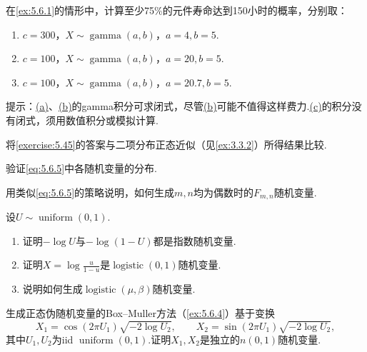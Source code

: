 \begin{exercise}\label{exercise:5.45}
在\autoref{ex:5.6.1}的情形中，计算至少75\%的元件寿命达到150小时的概率，分别取：
\begin{enumerate}[label=(\alph*)]\item{}\label{itm:exercise:5.45:a} $c=300$，$X\sim\operatorname{gamma}(a,b)$，$a=4,b=5$.\item{}\label{itm:exercise:5.45:b} $c=100$，$X\sim\operatorname{gamma}(a,b)$，$a=20,b=5$.\item{}\label{itm:exercise:5.45:c} $c=100$，$X\sim\operatorname{gamma}(a,b)$，$a=20.7,b=5$.\end{enumerate}
提示：\hyperref[itm:exercise:5.45:a]{(a)}、\hyperref[itm:exercise:5.45:b]{(b)}的gamma积分可求闭式，尽管\hyperref[itm:exercise:5.45:b]{(b)}可能不值得这样费力.\hyperref[itm:exercise:5.45:c]{(c)}的积分没有闭式，须用数值积分或模拟计算.
\end{exercise}
\begin{exercise}\label{exercise:5.46}
将\autoref{exercise:5.45}的答案与二项分布正态近似（见\autoref{ex:3.3.2}）所得结果比较.
\end{exercise}
\begin{exercise}\label{exercise:5.47}
验证\eqref{eq:5.6.5}中各随机变量的分布.
\end{exercise}
\begin{exercise}\label{exercise:5.48}
用类似\eqref{eq:5.6.5}的策略说明，如何生成$m,n$均为偶数时的$F_{m,n}$随机变量.
\end{exercise}
\begin{exercise}\label{exercise:5.49}
设$U\sim\operatorname{uniform}(0,1)$.
\begin{enumerate}[label=(\alph*)]\item 证明$-\log U$与$-\log(1-U)$都是指数随机变量.\item 证明$X=\log\frac u{1-u}$是$\operatorname{logistic}(0,1)$随机变量.\item 说明如何生成$\operatorname{logistic}(\mu,\beta)$随机变量.\end{enumerate}
\end{exercise}
\begin{exercise}\label{exercise:5.50}
生成正态伪随机变量的Box–Muller方法（\autoref{ex:5.6.4}）基于变换
$$X_1=\cos(2\pi U_1)\sqrt{-2\log U_2},\qquad X_2=\sin(2\pi U_1)\sqrt{-2\log U_2},$$
其中$U_1,U_2$为iid $\operatorname{uniform}(0,1)$.证明$X_1,X_2$是独立的$n(0,1)$随机变量.
\end{exercise}
